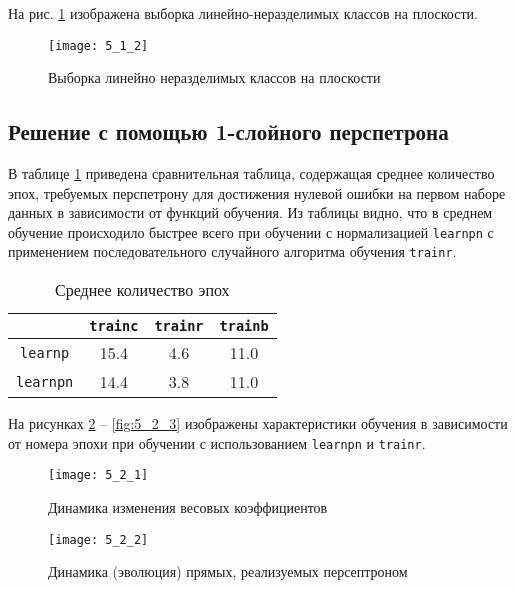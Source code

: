 \newpage

На рис. \ref{fig:5_1_2} изображена выборка линейно-неразделимых классов на плоскости.

\begin{figure}[H]
\begin{center}
	\texttt{[image: 5\_1\_2]}
	\caption{Выборка линейно неразделимых классов на плоскости}
	\label{fig:5_1_2}
\end{center}
\end{figure}

\subsection{Решение с помощью 1-слойного перспетрона}

В таблице \ref{tab:6_2_1} приведена сравнительная таблица, содержащая среднее количество эпох, требуемых перспетрону для достижения нулевой ошибки на первом наборе данных в зависимости от функций обучения. Из таблицы видно, что в среднем обучение происходило быстрее всего при обучении с нормализацией \verb+learnpn+ с применением последовательного случайного алгоритма обучения \verb+trainr+.

\begin{table}[H]
\begin{center}
	\def\tabcolsep{15pt}
	\caption{Среднее количество эпох}
	\label{tab:6_2_1}
	\begin{tabular}{|c|c|c|c|}
		\hline
		 & \verb+trainc+ & \verb+trainr+ & \verb+trainb+ \\
		\hline
		\verb+learnp+ & 15.4 & 4.6 & 11.0 \\
		\hline
		\verb+learnpn+ & 14.4 & 3.8 & 11.0 \\
		\hline
	\end{tabular}
\end{center}
\end{table} 

На рисунках \ref{fig:5_2_1} -- \ref{fig:5_2_3} изображены характеристики обучения в зависимости от номера эпохи при обучении с использованием \verb+learnpn+ и \verb+trainr+.
\begin{figure}[H]
\begin{center}
	\texttt{[image: 5\_2\_1]}
	\caption{Динамика изменения весовых коэффициентов}
	\label{fig:5_2_1}
\end{center}
\end{figure}
\vspace{-1cm}
\begin{figure}[H]
\begin{center}
	\texttt{[image: 5\_2\_2]}
	\caption{Динамика (эволюция) прямых, реализуемых персептроном}
	\label{fig:5_2_2}
\end{center}
\end{figure}

